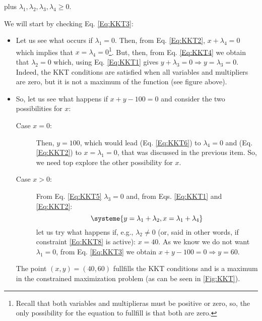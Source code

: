 \begin{itemize}
  plus $\lambda_1,\lambda_2,\lambda_3,\lambda_4\geq 0$.

  We will start by checking Eq. \ref{Eq:KKT3}:
  \begin{itemize}
    \item  Let us see what occurs if $\lambda_1=0$. Then, from Eq. \ref{Eq:KKT2}, $x+\lambda_4=0$ which implies that $x=\lambda_4=0$\footnote{Recall that both variables and multiplieras must be positive or zero, so, the only possibility for the equation to fullfill is that both are zero.}. But, then, from Eq. \ref{Eq:KKT4} we obtain that $\lambda_2=0$ which, using Eq. \ref{Eq:KKT1} gives $y+\lambda_3=0\Rightarrow y=\lambda_3=0$. Indeed, the KKT conditions are satisfied when all variables and multipliers are zero, but it is not a maximum of the function (see figure above).
    \item So, let us see what happens if $x+y-100=0$ and consider the two possibilities for $x$:
    \begin{description}
      \item[Case $x=0$:] Then, $y=100$, which would lead (Eq. \ref{Eq:KKT6}) to $\lambda_4=0$ and (Eq. \ref{Eq:KKT2}) to $x=\lambda_1=0$, that was discussed in the previous item. So, we need top explore the other possibility for $x$.
      \item[Case $x>0$:] From Eq. \ref{Eq:KKT5} $\lambda_3=0$ and, from Eqs. \ref{Eq:KKT1} and \ref{Eq:KKT2}:
      \[\systeme{y=\lambda_1+\lambda_2,x=\lambda_1+\lambda_4}
      \] 
      let us try what happens if, e.g., $\lambda_2\neq 0$ (or, said in other words, if constraint \ref{Eq:KKT8} is active): $x=40$. As we know we do not want $\lambda_1=0$, from Eq. \ref{Eq:KKT3} we obtain $x+y-100=0\Rightarrow y=60$.
    \end{description}

    The point $(x,y)=(40,60)$ fullfills the KKT conditions and is a maximum in the constrained maximization problem (as can be seen in \autoref{Fig:KKT}).

 \end{itemize}
\end{itemize}